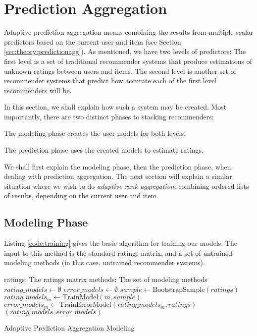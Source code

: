 \section{Prediction Aggregation}

Adaptive prediction aggregation means combining the results
from multiple scalar predictors based on the current user and item
(see Section \ref{sec:theory:predictionagg}).
As mentioned, we have two levels of predictors:
The first level is a set of traditional recommender systems
that produce estimations of unknown ratings between users and items.
The second level is another set of recommender systems 
that predict how accurate each of the first level recommenders will be.

In this section, we shall explain how such a system may be created.
Most importantly, there are two distinct phases to stacking recommenders:

\begin{enumerate*}
  \item The modeling phase creates the user models for both levels.
  \item The prediction phase uses the created models to estimate ratings.
\end{enumerate*}

We shall first explain the modeling phase, then the prediction phase,
when dealing with prediction aggregation.
The next section will explain a similar situation where
we wish to do \emph{adaptive rank aggregation}: 
combining ordered lists of results, depending on the current user and item.


\subsection{Modeling Phase}

Listing \ref{code:training} gives the basic algorithm for training
our models. The input to this method is the standard ratings matrix,
and a set of untrained modeling methods (in this case,
untrained recommender systems).

\begin{algorithm}
  \begin{algorithmic}[1]
  \REQUIRE ratings: The ratings matrix
  \REQUIRE methods: The set of modeling methods
  \ENSURE
    \STATE $rating\_models \gets \emptyset$
    \STATE $error\_models \gets \emptyset$
      \STATE $sample \gets \mathrm{BootstrapSample}(ratings)$
      \STATE $rating\_models_m \gets \mathrm{TrainModel}(m, sample)$
      \STATE $error\_models_m  \gets \mathrm{TrainErrorModel}(rating\_models_m, ratings)$
    \ENDFOR 
  \RETURN $(rating\_models, error\_models)$
  \end{algorithmic}
  \caption[Adaptive Prediction Aggregation Modeling]{Adaptive Prediction Aggregation Modeling
  }
  \label{code:training}
\end{algorithm}

